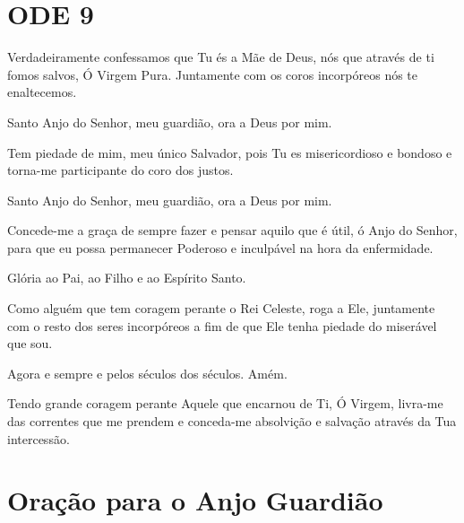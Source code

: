 \documentclass{subfiles}
\begin{document}
\section*{ODE 9}

\eirmos{}Verdadeiramente confessamos que Tu és a Mãe de Deus, nós que
através de ti fomos salvos, Ó Virgem Pura. Juntamente com os coros
incorpóreos nós te enaltecemos.

Santo Anjo do Senhor, meu guardião, ora a Deus por mim.

Tem piedade de mim, meu único Salvador, pois Tu es misericordioso e
bondoso e torna-me participante do coro dos justos.

Santo Anjo do Senhor, meu guardião, ora a Deus por mim.

Concede-me a graça de sempre fazer e pensar aquilo que é útil, ó Anjo
do Senhor, para que eu possa permanecer Poderoso e inculpável na hora da
enfermidade.

Glória ao Pai, ao Filho e ao Espírito Santo.

Como alguém que tem coragem perante o Rei Celeste, roga a Ele,
juntamente com o resto dos seres incorpóreos a fim de que Ele tenha piedade
do miserável que sou.

Agora e sempre e pelos séculos dos séculos. Amém.

Tendo grande coragem perante Aquele que encarnou de Ti, Ó Virgem,
livra-me das correntes que me prendem e conceda-me absolvição e salvação
através da Tua intercessão.

\section*{Oração para o Anjo Guardião}
\end{document}
